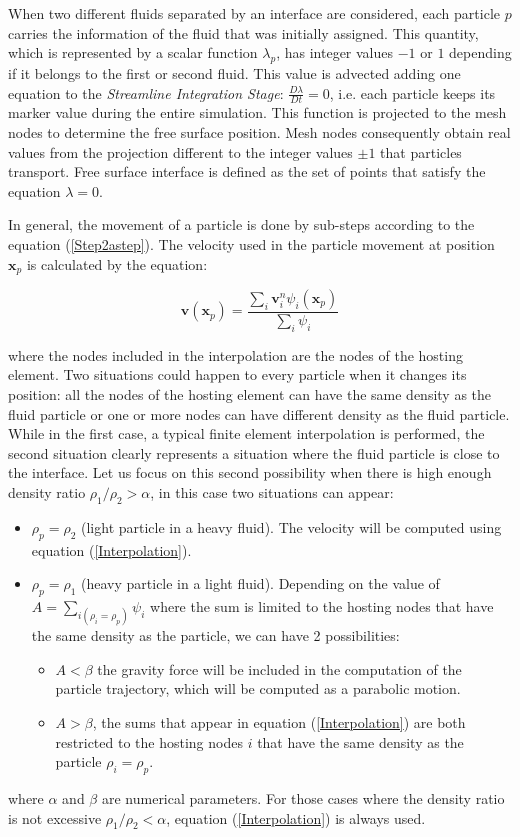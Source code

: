 When two different fluids separated by an interface are considered, each particle $p$ carries the information of the fluid that was initially assigned. This quantity, which is represented by a scalar function $\lambda_p$, has integer values $-1$ or $1$ depending if it belongs to the first or second fluid. This value is advected adding one equation to the \textit{Streamline Integration Stage}: $\frac{D\lambda}{Dt}=0$, i.e. each particle keeps its marker value during the entire simulation. This function is projected to the mesh nodes to determine the free surface position. Mesh nodes consequently obtain real values from the projection different to the integer values $\pm1$ that particles transport. Free surface interface is defined as the set of points that satisfy the equation $\lambda=0$.

In general, the movement of a particle is done by sub-steps according to the equation (\ref{Step2astep}). The velocity used in the particle movement at position $\mathbf{x}_p$ is calculated by the equation:

\begin{equation}\label{Interpolation}
    \displaystyle \mathbf{v}(\mathbf{x}_p)=\frac{\sum_{i}\mathbf{v}_i^n\psi_i(\mathbf{x}_p)}{\sum_{i}\psi_i}
\end{equation}

where the nodes included in the interpolation are the nodes of the hosting element. Two situations could happen to every particle when it changes its position: all the nodes of the hosting element can have the same density as the fluid particle or one or more nodes can have different density as the fluid particle. While in the first case, a typical finite element interpolation is performed, the second situation clearly represents a situation where the fluid particle is close to the interface. Let us focus on  this second possibility when there is high enough density ratio $\rho_1/\rho_2>\alpha$, in this case two situations can appear:

 \begin{itemize}
 \item $\rho_p=\rho_2$ (light particle in a heavy fluid). The velocity will be computed using equation (\ref{Interpolation}).
   \item $\rho_p=\rho_1$ (heavy particle in a light fluid). Depending on the value of $A=\sum_{i(\rho_i=\rho_p)}\psi_i$ where the sum is limited to the hosting nodes that have the same density as the particle, we can have 2 possibilities:
       \begin{itemize}
 \item $A<\beta$ the gravity force will be included in the computation of the particle trajectory, which will be computed as a parabolic motion.
   \item $A>\beta$, the sums that appear in equation (\ref{Interpolation}) are both restricted to the hosting nodes $i$ that have the same density as the particle $\rho_i=\rho_p$.
 \end{itemize}
 \end{itemize}
 where $\alpha$ and $\beta$ are numerical parameters. For those cases where the density ratio is not excessive $\rho_1/\rho_2<\alpha$, equation (\ref{Interpolation}) is always used.
 
